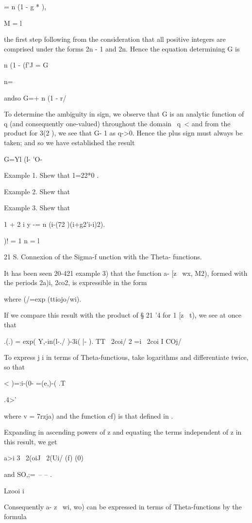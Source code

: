 = n (1 - g * ),

M = l

the first step following from the consideration that all positive
integers are comprised under the forms 2n - 1 and 2n. Hence the
equation determining G is

n (1 - (f'J = G\

n=\

andso G=+ n (1 - r/

%
%

To determine the ambiguity in sign, we observe that G is an analytic
function of q (and consequently one-valued) throughout the domain \ q\
< \; and from the product for 3(2 ), we see that G- 1 as q->0. Hence
the plus sign must always be taken; and so we have established the
result

G=Yl (l- 'O-

Example 1. Shew that 1=22*0 .

Example 2. Shew that

Example 3. Shew that

1 + 2 i y -= n (i-(72 )(i+g2'i-i)2).

)! = 1 n = l

21 S. Connexion of the Sigma-f unction with the Theta- functions.

It has been seen 20-421 example 3) that the function a- [z \ wx, M2),
formed with the periods 2a)i, 2co2, is expressible in the form

where (/=exp (ttiojo/wi).

If we compare this result with the product of § 21 '4 for 1 [z \ t),
we see at once that

.(.) = exp( Y,-in(l-./ )-3i( |- ). TT \ 2coi/ 2 =i \ 2coi I COj/

To express j i in terms of Theta-functious, take logarithms and
differentiate twice, so that

 < )=:i-(0- =(e,)-( .T

.4>'

where v = 7rzja) and the function cf) is that defined in .

Expanding in ascending powers of z and equating the terms independent
of z in this result, we get

a>i 3 \ 2(oiJ \ 2(Ui/ (f) (0)

and SO,;=\ -- -- .

Lzooi i

Consequently a- z \ wi, wo) can be expressed in terms of
Theta-functions by the formula

